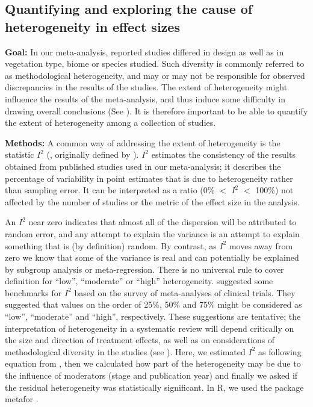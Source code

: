 \documentclass[a4paper,11pt]{article}
\begin{document}
\begin{appendices}
\subsection{Quantifying and exploring the cause of heterogeneity in effect sizes}

\noindent\textbf{Goal:} In our meta-analysis, reported studies differed in design as well as in vegetation type, biome or species studied. Such diversity is commonly referred to as methodological heterogeneity, and may or may not be responsible for observed discrepancies in the results of the studies. The extent of heterogeneity might influence the results of the meta-analysis, and thus induce some difficulty in drawing overall conclusions (See \citealt{Higgins:2002iq}). It is therefore important to be able to quantify the extent of heterogeneity among a collection of studies.

\noindent\textbf{Methods:} A common way of addressing the extent of heterogeneity is the statistic $I^{2}$ (\citealt{Santos:2012gt}, originally defined by \citealt{Higgins:2002iq}). $I^{2}$ estimates the consistency of the results obtained from published studies used in our meta-analysis; it describes the percentage of variability in point estimates that is due to heterogeneity rather than sampling error. It can be interpreted as a ratio (0\% $<$ $I^{2}$ $<$ 100\%) not affected by the number of studies or the metric of the effect size in the analysis.

An $I^{2}$ near zero indicates that almost all of the dispersion will be attributed to random error, and any attempt to explain the variance is an attempt to explain something that is (by definition) random. By contrast, as $I^{2}$ moves away from zero we know that some of the variance is real and can potentially be explained by subgroup analysis or meta-regression.
There is no universal rule to cover definition for ``low'', ``moderate'' or ``high'' heterogeneity. \citealt{Higgins:2003hz} suggested some benchmarks for $I^{2}$ based on the survey of meta-analyses of clinical trials. They suggested that values on the order of 25\%, 50\% and 75\% might be considered as ``low'', ``moderate'' and ``high'', respectively. These suggestions are tentative; the interpretation of heterogeneity in a systematic review will depend critically on the size and direction of treatment effects, as well as on considerations of methodological diversity in the studies (see \citealt{Borenstein:2009um}).
Here, we estimated $I^{2}$ as following equation from \citealt{Higgins:2002iq}, then we calculated how part of the heterogeneity may be due to the influence of moderators (stage and publication year) and finally we asked if the residual heterogeneity was statistically significant. In R, we used the package metafor  \citep{Viechtbauer-2010}.



\end{appendices}
\end{document}
